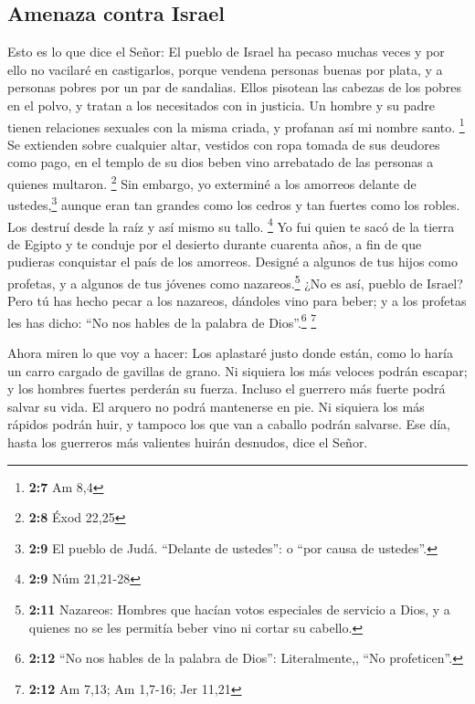 \hypertarget{amenaza-contra-israel}{%
\subsection{Amenaza contra Israel}\label{amenaza-contra-israel}}

 Esto es lo que dice el Señor: El pueblo de Israel ha
pecaso muchas veces y por ello no vacilaré en castigarlos, porque
vendena personas buenas por plata, y a personas pobres por un par de
sandalias.  Ellos pisotean las cabezas de los pobres en el
polvo, y tratan a los necesitados con in justicia. Un hombre y su padre
tienen relaciones sexuales con la misma criada, y profanan así mi nombre
santo. \footnote{\textbf{2:7} Am 8,4}  Se extienden sobre
cualquier altar, vestidos con ropa tomada de sus deudores como pago, en
el templo de su dios beben vino arrebatado de las personas a quienes
multaron. \footnote{\textbf{2:8} Éxod 22,25}  Sin embargo,
yo exterminé a los amorreos delante de ustedes,\footnote{\textbf{2:9} El
  pueblo de Judá. ``Delante de ustedes'': o ``por causa de ustedes''.}
aunque eran tan grandes como los cedros y tan fuertes como los robles.
Los destruí desde la raíz y así mismo su tallo. \footnote{\textbf{2:9}
  Núm 21,21-28}  Yo fui quien te sacó de la tierra de
Egipto y te conduje por el desierto durante cuarenta años, a fin de que
pudieras conquistar el país de los amorreos.  Designé a
algunos de tus hijos como profetas, y a algunos de tus jóvenes como
nazareos.\footnote{\textbf{2:11} Nazareos: Hombres que hacían votos
  especiales de servicio a Dios, y a quienes no se les permitía beber
  vino ni cortar su cabello.} ¿No es así, pueblo de Israel?
 Pero tú has hecho pecar a los nazareos, dándoles vino
para beber; y a los profetas les has dicho: ``No nos hables de la
palabra de Dios''.\footnote{\textbf{2:12} ``No nos hables de la palabra
  de Dios'': Literalmente,, ``No profeticen''.} \footnote{\textbf{2:12}
  Am 7,13; Am 1,7-16; Jer 11,21}

 Ahora miren lo que voy a hacer: Los aplastaré justo
donde están, como lo haría un carro cargado de gavillas de grano.
 Ni siquiera los más veloces podrán escapar; y los
hombres fuertes perderán su fuerza. Incluso el guerrero más fuerte podrá
salvar su vida.  El arquero no podrá mantenerse en pie.
Ni siquiera los más rápidos podrán huir, y tampoco los que van a caballo
podrán salvarse.  Ese día, hasta los guerreros más
valientes huirán desnudos, dice el Señor.

